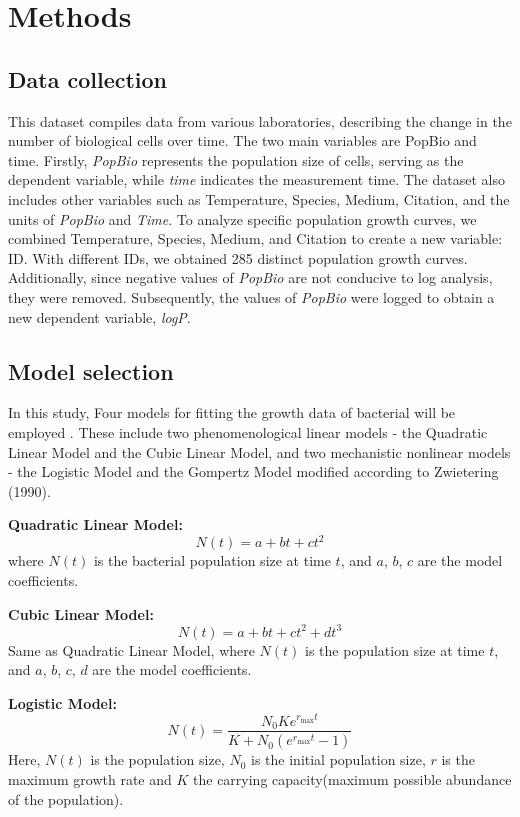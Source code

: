 \documentclass[11pt]{article}
\begin{document}
\section{Methods}

\subsection{Data collection} 

This dataset compiles data from various laboratories, describing the change in the number of biological cells over time. The two main variables are PopBio and time. Firstly, \textit{PopBio} represents the population size of cells, serving as the dependent variable, while \textit{time} indicates the measurement time. The dataset also includes other variables such as Temperature, Species, Medium, Citation, and the units of \textit{PopBio} and \textit{Time}. To analyze specific population growth curves, we combined Temperature, Species, Medium, and Citation to create a new variable: ID. With different IDs, we obtained 285 distinct population growth curves. Additionally, since negative values of \textit{PopBio} are not conducive to log analysis, they were removed. Subsequently, the values of \textit{PopBio} were logged to obtain a new dependent variable, \textit{logP}.

\subsection{Model selection}

In this study, Four models for fitting the growth data of bacterial will be employed . These include two phenomenological linear models - the Quadratic Linear Model and the Cubic Linear Model, and two mechanistic nonlinear models - the Logistic Model and the Gompertz Model modified according to Zwietering (1990).

\textbf{Quadratic Linear Model:}
\[ N(t) = a + bt + ct^2 \]
where \( N(t) \) is the bacterial population size at time \( t \), and \( a \), \( b \), \( c \) are the model coefficients.

\textbf{Cubic Linear Model:}
\[ N(t) = a + bt + ct^2 + dt^3 \]
Same as Quadratic Linear Model, where \( N(t) \) is the  population size at time \( t \), and \( a \), \( b \), \( c \), \( d \) are the model coefficients.

\textbf{Logistic Model:}
\[ N(t) = \frac{N_0 K e^{r_{\max} t}}{K + N_0 (e^{r_{\max} t} - 1)} \]
Here, $N(t)$ is the population size, $N_0$ is the initial population size, $r$ is the maximum growth rate and $K$ the carrying capacity(maximum possible abundance of the population).
\end{document}
